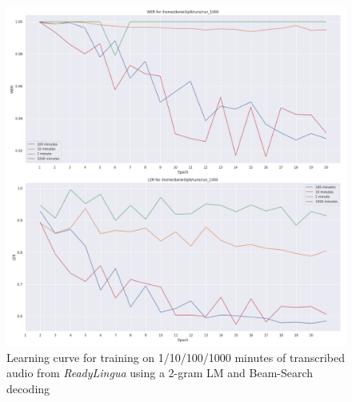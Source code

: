 \begin{figure}
	\includegraphics[width=\linewidth]{./img/learning_curve_lm_beamsearch.png}
	\caption{Learning curve for training on 1/10/100/1000 minutes of transcribed audio from \textit{ReadyLingua} using a 2-gram \ac{LM} and Beam-Search decoding}
	\label{learning_curve_with_lm}
\end{figure}

